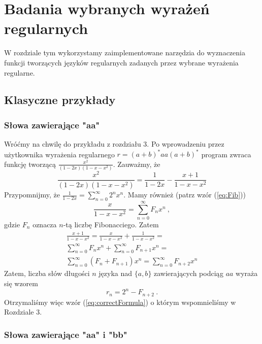 \chapter{Badania wybranych wyrażeń regularnych} \label{chapt:wybrane}

W rozdziale tym wykorzystamy zaimplementowane narzędzia do wyznaczenia funkcji tworzących języków regularnych zadanych przez wybrane wyrażenia regularne.

\section{Klasyczne przykłady}

\subsection{Słowa zawierające "aa"}
Wróćmy na chwilę do przykładu z rozdziału 3. Po wprowadzeniu przez użytkownika wyrażenia regularnego $r=(a+b)^*aa(a+b)^*$ program zwraca funkcję tworzącą $\frac{x^2}{(1-2x)(1-x-x^2)}$. 
Zauważmy, że 
$$
\frac{x^2}{(1-2x)(1-x-x^2)} =
\frac{1}{1-2x} - 
\frac{x+1}{1-x-x^2}
$$
Przypomnijmy, że $\frac{1}{1-2 x} = \sum_{n=0}^{\infty} 2^n x^n$. Mamy również (patrz wzór (\ref{eq:Fib}))
$$
  \frac{x}{1-x-x^2} = \sum_{n=0}^{\infty} F_n x^n~,
$$
gdzie $F_n$ oznacza $n$-tą liczbę Fibonacciego. Zatem
\begin{gather*}
\frac{x+1}{1-x-x^2} = \frac{x}{1-x-x^2} + \frac{1}{1-x-x^2} = \\
\sum_{n=0}^{\infty} F_n x^n + \sum_{n=0}^{\infty} F_{n+1} x^n = \\
\sum_{n=0}^{\infty} (F_n+F_{n+1}) x^n = \sum_{n=0}^{\infty} F_{n+2} x^n
\end{gather*}
Zatem, liczba słów długości $n$ języka nad $\{a,b\}$ zawierających podciąg $aa$ wyraża się wzorem
$$
  r_n = 2^n - F_{n+2}~.
$$
Otrzymaliśmy więc wzór (\ref{eq:correctFormula}) o którym wspomnieliśmy w Rozdziale 3.

\subsection{Słowa zawierające "aa" i "bb"}

